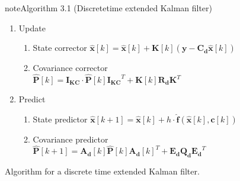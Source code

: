 \begin{figure}[h]
\begin{sphinxadmonition}{note}{Algorithm 3.1 (Discrete\sphinxhyphen{}time extended Kalman filter)}
\begin{enumerate}
\begin{enumerate}
\begin{enumerate}
\(\mathbf{I_{KC}} = \mathbf{I_n} - \mathbf{K}[k] \mathbf{C_d}\)

\end{enumerate}

\item {} 

Update
\begin{enumerate}
%
\item {} 

State corrector
\(\mathbf{\hat{x}}[k] = \mathbf{\hat{x}}[k] + \mathbf{K}[k] (\mathbf{y} - \mathbf{C_d} \mathbf{\hat{x}}[k]) \)

\item {} 

Covariance corrector
\(\mathbf{\hat{P}}[k] = \mathbf{I_{KC}} \cdot \mathbf{\hat{P}}[k] \mathbf{I_{KC}}^T + \mathbf{K}[k] \mathbf{R_d} \mathbf{K}^T \)

\end{enumerate}

\item {} 

Predict
\begin{enumerate}
%
\item {} 

State predictor
\(\mathbf{\hat{x}}[k+1] = \mathbf{\hat{x}}[k] + h \cdot \mathbf{\hat{f}}(\mathbf{\hat{x}}[k], \mathbf{c}[k])\)

\item {} 

Covariance predictor
\(\mathbf{\hat{P}}[k+1] = \mathbf{A_d}[k]  \mathbf{\hat{P}}[k] \mathbf{A_d}[k]^T + \mathbf{E_d} \mathbf{Q_d} \mathbf{E_d}^T \)

\end{enumerate}

\end{enumerate}

\end{enumerate}
\end{sphinxadmonition}
\caption{Algorithm for a discrete time extended Kalman filter.}
\label{fig:ek-algorithm} 
\end{figure}